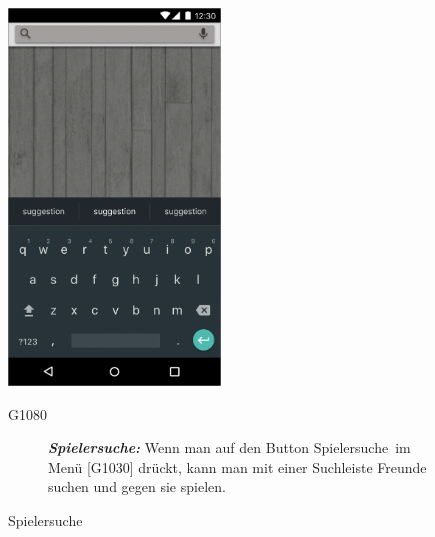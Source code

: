 \documentclass[parskip=full]{scrartcl}
\begin{document}
\begin{figure}[htp]
	\begin{minipage}[t]{6cm}
		\vspace{0pt}
		\includegraphics[height=100mm]{spielersuche.png}
		\caption{Spielersuche}
		\label{fig:Spielersuche}
	\end{minipage}
	\hfill
	\begin{minipage}[t]{6cm}
		\vspace{0pt}
		\begin{description}
			\item[G1080] \textbf{\textit{Spielersuche: }} Wenn man auf den Button \glqq Spielersuche\grqq\ im Menü [G1030] drückt, kann man mit einer Suchleiste Freunde suchen und gegen sie spielen.
		\end{description}
	\end{minipage}
\end{figure}
\end{document}
